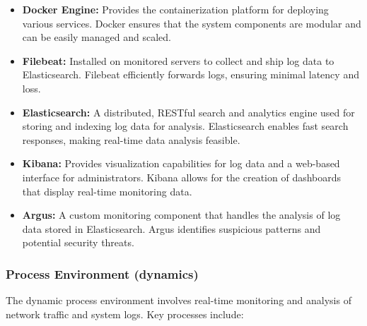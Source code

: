 \documentclass{article}
\begin{document}
    \begin{itemize}
        \item \textbf{Docker Engine:} Provides the containerization platform for deploying various services.
        Docker ensures that the system components are modular and can be easily managed and scaled.
        \item \textbf{Filebeat:} Installed on monitored servers to collect and ship log data to Elasticsearch.
        Filebeat efficiently forwards logs, ensuring minimal latency and loss.
        \item \textbf{Elasticsearch:} A distributed, RESTful search and analytics engine used for storing and indexing log data for analysis.
        Elasticsearch enables fast search responses, making real-time data analysis feasible.
        \item \textbf{Kibana:} Provides visualization capabilities for log data and a web-based interface for administrators.
        Kibana allows for the creation of dashboards that display real-time monitoring data.
        \item \textbf{Argus:} A custom monitoring component that handles the analysis of log data stored in Elasticsearch.
        Argus identifies suspicious patterns and potential security threats.
    \end{itemize}

    \subsubsection{Process Environment (dynamics)}\label{subsubsec:process-environment}

    The dynamic process environment involves real-time monitoring and analysis of network traffic and system logs.
    Key processes include:
\end{document}
